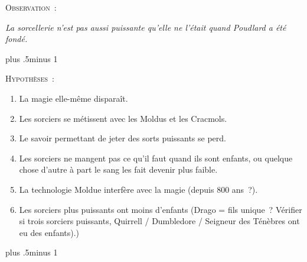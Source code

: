 \begin{centering}
\begin{samepage}
\scshape Observation~:

\itshape La sorcellerie n'est pas aussi puissante qu'elle ne l'était quand Poudlard a été fondé. \end{samepage}

\baselineskip plus .5\textheight minus 1\baselineskip

\begin{samepage}
\scshape Hypothèses~:
\itshape
        \begin{enumerate}[1.]
                \firmlist
                \setlength{\leftmargin}{\parindent}
                \setlength{\rightmargin}{\parindent}
        \item La magie elle-même disparaît.
        \item Les sorciers se métissent avec les Moldus et les Cracmols.
        \item Le savoir permettant de jeter des sorts puissants se perd.
        \item Les sorciers ne mangent pas ce qu'il faut quand ils sont enfants, ou quelque chose d'autre à part le sang les fait devenir plus faible.
        \item La technologie Moldue interfère avec la magie (depuis 800 ans~?).
        \item Les sorciers plus puissants ont moins d'enfants (Drago = fils unique~? Vérifier si trois sorciers puissants, Quirrell / Dumbledore / Seigneur des Ténèbres ont eu des enfants).)
        \end{enumerate}
\end{samepage}

\baselineskip plus .5\textheight minus 1\baselineskip


\end{centering}
